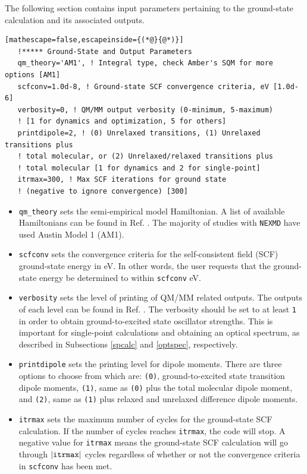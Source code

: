 \documentclass[letterpaper,12pt,titlepage]{article}
\begin{document}
\noindent The following section contains input parameters pertaining to the ground-state calculation and its associated outputs.
\begin{lstlisting}[mathescape=false,escapeinside={(*@}{@*)}]
   !***** Ground-State and Output Parameters
   qm_theory='AM1', ! Integral type, check Amber's SQM for more options [AM1]
   scfconv=1.0d-8, ! Ground-state SCF convergence criteria, eV [1.0d-6]
   verbosity=0, ! QM/MM output verbosity (0-minimum, 5-maximum) 
   ! [1 for dynamics and optimization, 5 for others]
   printdipole=2, ! (0) Unrelaxed transitions, (1) Unrelaxed transitions plus 
   ! total molecular, or (2) Unrelaxed/relaxed transitions plus 
   ! total molecular [1 for dynamics and 2 for single-point]
   itrmax=300, ! Max SCF iterations for ground state 
   ! (negative to ignore convergence) [300]
\end{lstlisting}
 \begin{itemize}
\item \verb+qm_theory+ sets the semi-empirical model Hamiltonian.  A list of available Hamiltonians can be found in Ref. \cite{amber2017}.  The majority of studies with \verb+NEXMD+ have used Austin Model 1 (AM1).  
\item \verb+scfconv+ sets the convergence criteria for the self-consistent field (SCF) ground-state energy in eV. In other words, the user requests that the ground-state energy be determined to within \verb+scfconv+ eV.
\item \verb+verbosity+ sets the level of printing of QM/MM related outputs.  The outputs of each level can be found in Ref. \cite{amber2017}.  The verbosity should be set to at least \verb+1+ in order to obtain ground-to-excited state oscillator strengths.  This is important for single-point calculations and obtaining an optical spectrum, as described in Subsections \ref{spcalc} and \ref{optspec}, respectively.
\item \verb+printdipole+ sets the printing level for dipole moments.  There are three options to choose from which are: \verb+(0)+, ground-to-excited state transition dipole moments, \verb+(1)+, same as \verb+(0)+ plus the total molecular dipole moment, and \verb+(2)+, same as \verb+(1)+ plus relaxed and unrelaxed difference dipole moments.
\item \verb+itrmax+ sets the maximum number of cycles for the ground-state SCF calculation.  If the number of cycles reaches \verb+itrmax+, the code will stop.  A negative value for \verb+itrmax+ means the ground-state SCF calculation will go through $\left|\verb+itrmax+\right|$ cycles regardless of whether or not the convergence criteria in \verb+scfconv+ has been met.
\end{itemize}
\end{document}
